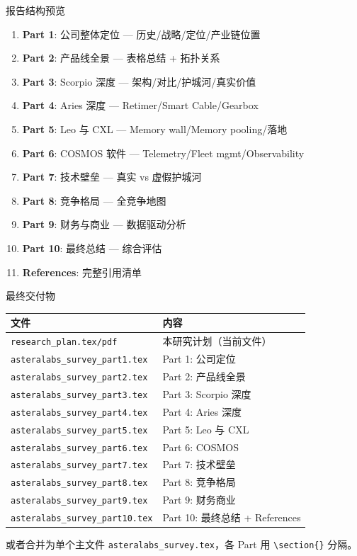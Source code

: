 \documentclass[UTF8,11pt,aspectratio=169]{beamer}
\begin{document}
\begin{frame}{报告结构预览}
    \begin{enumerate}
        \item \textbf{Part 1}: 公司整体定位 — 历史/战略/定位/产业链位置
        \item \textbf{Part 2}: 产品线全景 — 表格总结 + 拓扑关系
        \item \textbf{Part 3}: Scorpio 深度 — 架构/对比/护城河/真实价值
        \item \textbf{Part 4}: Aries 深度 — Retimer/Smart Cable/Gearbox
        \item \textbf{Part 5}: Leo 与 CXL — Memory wall/Memory pooling/落地
        \item \textbf{Part 6}: COSMOS 软件 — Telemetry/Fleet mgmt/Observability
        \item \textbf{Part 7}: 技术壁垒 — 真实 vs 虚假护城河
        \item \textbf{Part 8}: 竞争格局 — 全竞争地图
        \item \textbf{Part 9}: 财务与商业 — 数据驱动分析
        \item \textbf{Part 10}: 最终总结 — 综合评估
        \item \textbf{References}: 完整引用清单
    \end{enumerate}
\end{frame}

\begin{frame}{最终交付物}
    \begin{table}
        \centering
        \begin{tabular}{ll}
            \toprule
            \textbf{文件} & \textbf{内容} \\
            \midrule
            \texttt{research\_plan.tex/pdf} & 本研究计划（当前文件）\\
            \texttt{asteralabs\_survey\_part1.tex} & Part 1: 公司定位 \\
            \texttt{asteralabs\_survey\_part2.tex} & Part 2: 产品线全景 \\
            \texttt{asteralabs\_survey\_part3.tex} & Part 3: Scorpio 深度 \\
            \texttt{asteralabs\_survey\_part4.tex} & Part 4: Aries 深度 \\
            \texttt{asteralabs\_survey\_part5.tex} & Part 5: Leo 与 CXL \\
            \texttt{asteralabs\_survey\_part6.tex} & Part 6: COSMOS \\
            \texttt{asteralabs\_survey\_part7.tex} & Part 7: 技术壁垒 \\
            \texttt{asteralabs\_survey\_part8.tex} & Part 8: 竞争格局 \\
            \texttt{asteralabs\_survey\_part9.tex} & Part 9: 财务商业 \\
            \texttt{asteralabs\_survey\_part10.tex} & Part 10: 最终总结 + References \\
            \bottomrule
        \end{tabular}
    \end{table}
    或者合并为单个主文件 \texttt{asteralabs\_survey.tex}，各 Part 用 \texttt{\textbackslash section\{\}} 分隔。
\end{frame}
\end{document}
